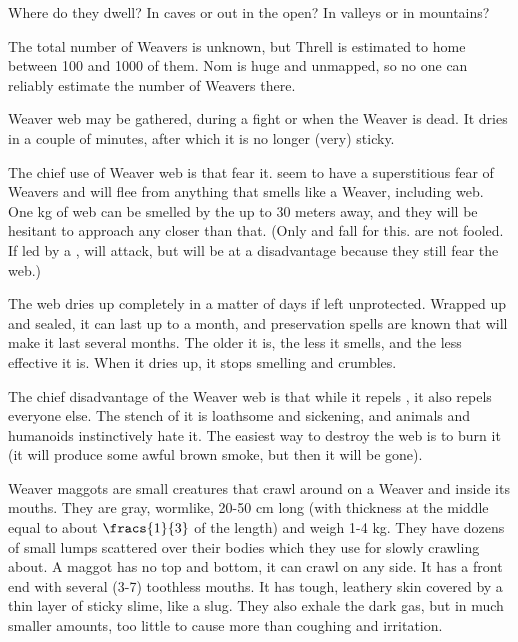 Where do they dwell? In caves or out in the open? In valleys or in mountains? 

The total number of Weavers is unknown, but Threll is estimated to home between 100 and 1000 of them. Nom is huge and unmapped, so no one can reliably estimate the number of Weavers there. 

Weaver web may be gathered, during a fight or when the Weaver is dead. It dries in a couple of minutes, after which it is no longer (very) sticky. 

The chief use of Weaver web is that \banes{} fear it. \Banes{} seem to have a superstitious fear of Weavers and will flee from anything that smells like a Weaver, including web. One kg of web can be smelled by the \banes{} up to 30 meters away, and they will be hesitant to approach any closer than that. (Only \banespawn{} and \lesserbanes{} fall for this. \Banelords{} are not fooled. If led by a \banelord{}, \lesserbanes{} will attack, but will be at a disadvantage because they still fear the web.) 

The web dries up completely in a matter of days if left unprotected. Wrapped up and sealed, it can last up to a month, and preservation spells are known that will make it last several months. The older it is, the less it smells, and the less effective it is. When it dries up, it stops smelling and crumbles. 

The chief disadvantage of the Weaver web is that while it repels \banes{}, it also repels everyone else. The stench of it is loathsome and sickening, and animals and humanoids instinctively hate it. The easiest way to destroy the web is to burn it (it will produce some awful brown smoke, but then it will be gone).

Weaver maggots are small creatures that crawl around on a Weaver and inside its mouths. They are gray, wormlike, 20-50 cm long (with thickness at the middle equal to about $\fracs{1}{3}$ of the length) and weigh 1-4 kg. They have dozens of small lumps scattered over their bodies which they use for slowly crawling about. A maggot has no top and bottom, it can crawl on any side. It has a front end with several (3-7) toothless mouths. It has tough, leathery skin covered by a thin layer of sticky slime, like a slug. They also exhale the dark gas, but in much smaller amounts, too little to cause more than coughing and irritation. 


